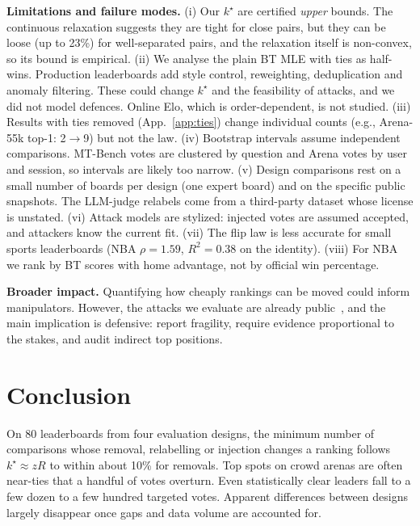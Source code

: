 \documentclass{article}
\newcommand{\kstar}{k^\star}
\begin{document}
\textbf{Limitations and failure modes.} (i) Our $\kstar$ are certified \emph{upper} bounds. The continuous relaxation suggests they are tight for close pairs, but they can be loose (up to 23\%) for well-separated pairs, and the relaxation itself is non-convex, so its bound is empirical. (ii) We analyse the plain BT MLE with ties as half-wins. Production leaderboards add style control, reweighting, deduplication and anomaly filtering. These could change $\kstar$ and the feasibility of attacks, and we did not model defences. Online Elo, which is order-dependent, is not studied. (iii) Results with ties removed (App.~\ref{app:ties}) change individual counts (e.g., Arena-55k top-1: 2$\to$9) but not the law. (iv) Bootstrap intervals assume independent comparisons. MT-Bench votes are clustered by question and Arena votes by user and session, so intervals are likely too narrow. (v) Design comparisons rest on a small number of boards per design (one expert board) and on the specific public snapshots. The LLM-judge relabels come from a third-party dataset whose license is unstated. (vi) Attack models are stylized: injected votes are assumed accepted, and attackers know the current fit. (vii) The flip law is less accurate for small sports leaderboards (NBA $\rho=1.59$, $R^2=0.38$ on the identity). (viii) For NBA we rank by BT scores with home advantage, not by official win percentage.

\textbf{Broader impact.} Quantifying how cheaply rankings can be moved could inform manipulators. However, the attacks we evaluate are already public~\citep{min2025improving}, and the main implication is defensive: report fragility, require evidence proportional to the stakes, and audit indirect top positions.

\section{Conclusion}

On 80 leaderboards from four evaluation designs, the minimum number of comparisons whose removal, relabelling or injection changes a ranking follows $\kstar\approx zR$ to within about 10\% for removals. Top spots on crowd arenas are often near-ties that a handful of votes overturn. Even statistically clear leaders fall to a few dozen to a few hundred targeted votes. Apparent differences between designs largely disappear once gaps and data volume are accounted for.



\end{document}
